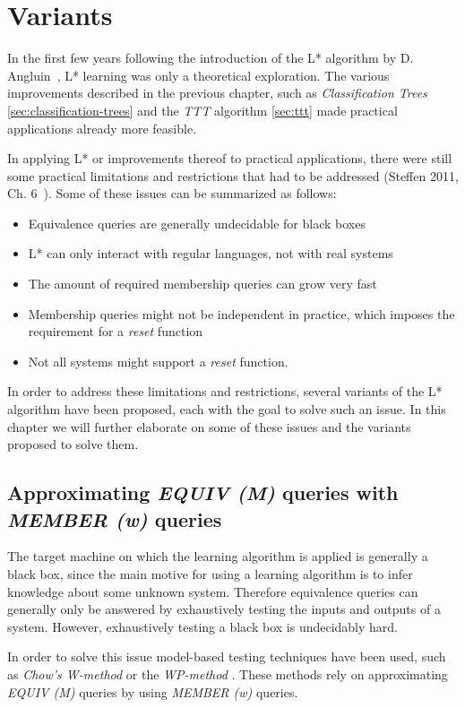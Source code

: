 \documentclass[multi,crop=false,class=article]{standalone}
\begin{document}
\section{Variants}
\label{sec:variants}
In the first few years following the introduction of the L* algorithm by
D. Angluin~\cite{Angluin87}, L* learning was only a theoretical exploration.
The various improvements described in the previous chapter,
such as \textit{Classification Trees} \cref{sec:classification-trees} and
the \textit{TTT} algorithm \cref{sec:ttt}
made practical applications already more feasible.

In applying L* or improvements thereof to practical applications,
there were still some practical limitations and restrictions that had to
be addressed (Steffen 2011, Ch. 6~\cite{Steffen11}).
Some of these issues can be summarized as follows:
\begin{itemize}
  \item Equivalence queries are generally undecidable for black boxes
  \item L* can only interact with regular languages, not with real systems
  \item The amount of required membership queries can grow very fast
  \item Membership queries might not be independent in practice,
        which imposes the requirement for a \textit{reset} function
  \item Not all systems might support a \textit{reset} function.
\end{itemize}

In order to address these limitations and restrictions,
several variants of the L* algorithm have been proposed,
each with the goal to solve such an issue.
In this chapter we will further elaborate on some of these issues
and the variants proposed to solve them.

\subsection{Approximating \textit{EQUIV (M)} queries with \textit{MEMBER (w)} queries}
The target machine on which the learning algorithm is applied is generally
a black box, since the main motive for using a learning algorithm is to
infer knowledge about some unknown system.
Therefore equivalence queries can generally only be answered by exhaustively
testing the inputs and outputs of a system.
However, exhaustively testing a black box is undecidably hard.

In order to solve this issue model-based testing techniques have been used,
such as \textit{Chow's W-method} or the \textit{WP-method} .
These methods rely on approximating \textit{EQUIV (M)} queries by using
\textit{MEMBER (w)} queries.
\end{document}
